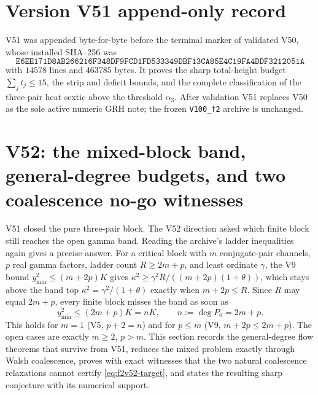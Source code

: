 \documentclass[11pt]{article}
\theoremstyle{definition}
\theoremstyle{remark}
\begin{document}
\section*{Version V51 append-only record}

V51 was appended byte-for-byte before the terminal marker of validated
V50, whose installed SHA--256 was
\[
 \texttt{E6EE171D8AB266216F348DF9FCD1FD53}
 \allowbreak\texttt{3349DBF13CA85E4C19FA4DDF3212051A}
\]
with \(14578\) lines and \(463785\) bytes.  It proves the sharp
total-height budget \(\sum_jt_j\le15\), the strip and deficit bounds, and
the complete classification of the three-pair heat sextic above the
threshold \(\alpha_3\).  After validation V51 replaces V50 as the sole
active numeric GRH note; the frozen \texttt{V100\_f2} archive is
unchanged.





\clearpage
\section{V52: the mixed-block band, general-degree budgets, and two coalescence no-go witnesses}
\label{sec:f2v52-mixed-band}
\begingroup
\setcounter{equation}{0}
\renewcommand{\theequation}{N52.\arabic{equation}}
\renewcommand{\theHequation}{f2v52.\arabic{equation}}

V51 closed the pure three-pair block.  The V52 direction asked which
finite block still reaches the open gamma band.  Reading the archive's
ladder inequalities again gives a precise answer.  For a critical block
with \(m\) conjugate-pair channels, \(p\) real gamma factors, ladder
count \(R\ge2m+p\), and least ordinate \(\gamma\), the V9 bound
\(y_{\min}^2\le(m+2p)K\) gives \(\kappa^2\ge\gamma^2R/((m+2p)(1+\theta))\),
which stays above the band top \(\kappa^2=\gamma^2/(1+\theta)\) exactly
when \(m+2p\le R\).  Since \(R\) may equal \(2m+p\), every finite block
misses the band as soon as
\begin{equation}
 \boxed{y_{\min}^2\le(2m+p)K=nK,\qquad n:=\deg P_0=2m+p.}
 \label{eq:f2v52-target}
\end{equation}
This holds for \(m=1\) (V5, \(p+2=n\)) and for \(p\le m\) (V9,
\(m+2p\le2m+p\)).  The open cases are exactly \(m\ge2\), \(p>m\).  This
section records the general-degree flow theorems that survive from V51,
reduces the mixed problem exactly through Walsh coalescence, proves with
exact witnesses that the two natural coalescence relaxations cannot
certify \eqref{eq:f2v52-target}, and states the resulting sharp
conjecture with its numerical support.
\end{document}
